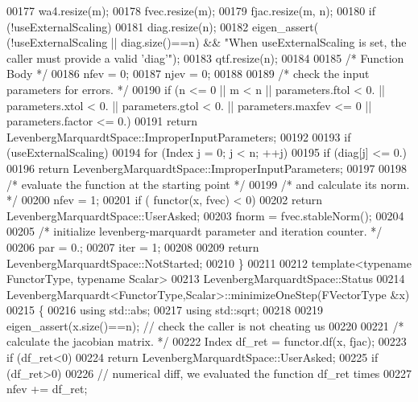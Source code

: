 \begin{DoxyCode}
00177     wa4.resize(m);
00178     fvec.resize(m);
00179     fjac.resize(m, n);
00180     \textcolor{keywordflow}{if} (!useExternalScaling)
00181         diag.resize(n);
00182     eigen\_assert( (!useExternalScaling || diag.size()==n) && \textcolor{stringliteral}{"When useExternalScaling is set, the caller
       must provide a valid 'diag'"});
00183     qtf.resize(n);
00184 
00185     \textcolor{comment}{/* Function Body */}
00186     nfev = 0;
00187     njev = 0;
00188 
00189     \textcolor{comment}{/*     check the input parameters for errors. */}
00190     \textcolor{keywordflow}{if} (n <= 0 || m < n || parameters.ftol < 0. || parameters.xtol < 0. || parameters.gtol < 0. || 
      parameters.maxfev <= 0 || parameters.factor <= 0.)
00191         \textcolor{keywordflow}{return} LevenbergMarquardtSpace::ImproperInputParameters;
00192 
00193     \textcolor{keywordflow}{if} (useExternalScaling)
00194         \textcolor{keywordflow}{for} (Index j = 0; j < n; ++j)
00195             \textcolor{keywordflow}{if} (diag[j] <= 0.)
00196                 \textcolor{keywordflow}{return} LevenbergMarquardtSpace::ImproperInputParameters;
00197 
00198     \textcolor{comment}{/*     evaluate the function at the starting point */}
00199     \textcolor{comment}{/*     and calculate its norm. */}
00200     nfev = 1;
00201     \textcolor{keywordflow}{if} ( functor(x, fvec) < 0)
00202         \textcolor{keywordflow}{return} LevenbergMarquardtSpace::UserAsked;
00203     fnorm = fvec.stableNorm();
00204 
00205     \textcolor{comment}{/*     initialize levenberg-marquardt parameter and iteration counter. */}
00206     par = 0.;
00207     iter = 1;
00208 
00209     \textcolor{keywordflow}{return} LevenbergMarquardtSpace::NotStarted;
00210 \}
00211 
00212 \textcolor{keyword}{template}<\textcolor{keyword}{typename} FunctorType, \textcolor{keyword}{typename} Scalar>
00213 LevenbergMarquardtSpace::Status
00214 LevenbergMarquardt<FunctorType,Scalar>::minimizeOneStep(FVectorType  &x)
00215 \{
00216     \textcolor{keyword}{using} std::abs;
00217     \textcolor{keyword}{using} std::sqrt;
00218 
00219     eigen\_assert(x.size()==n); \textcolor{comment}{// check the caller is not cheating us}
00220 
00221     \textcolor{comment}{/* calculate the jacobian matrix. */}
00222     Index df\_ret = functor.df(x, fjac);
00223     \textcolor{keywordflow}{if} (df\_ret<0)
00224         \textcolor{keywordflow}{return} LevenbergMarquardtSpace::UserAsked;
00225     \textcolor{keywordflow}{if} (df\_ret>0)
00226         \textcolor{comment}{// numerical diff, we evaluated the function df\_ret times}
00227         nfev += df\_ret;

\end{DoxyCode}
